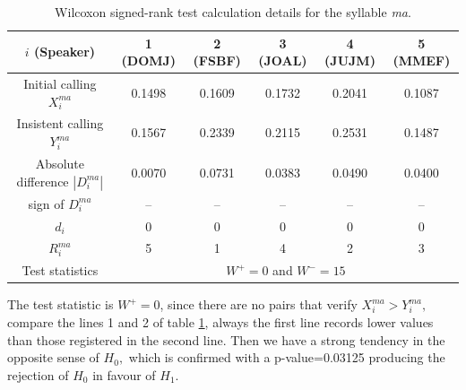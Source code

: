 \documentclass[11pt]{article}
\begin{document}
\begin{table}[!htb]
    \centering
    \footnotesize
        \caption{Wilcoxon signed-rank test calculation details for the syllable \textit{ma}.  }
    
    \begin{tabular}{c|ccccc}
        \hline
        $i$ (Speaker) & 
        1 {\tiny(DOMJ)} & %
        2 {\tiny(FSBF)} & %
        3 {\tiny(JOAL)} & %
        4 {\tiny(JUJM)} & %
        5 {\tiny(MMEF)} \\ %
        \hline
        Initial calling $X_i^{ma}$ &
        0.1498 &
        0.1609 &
        0.1732 &
        0.2041 &
        0.1087 \\
        Insistent calling $Y_i^{ma}$ &
        0.1567 &
        0.2339 &
        0.2115 &
        0.2531 &
        0.1487 \\
        Absolute difference $\left| D_i^{ma} \right|$ & %
        0.0070 &
        0.0731 &
        0.0383 &
        0.0490 &
        0.0400 \\
        sign of $ D_i^{ma}$ &
        -- &
        -- &
        -- &
        -- &
        --  \\
        $d_i$ &
        0 &
        0 &
        0 &
        0 &
        0  \\
        $R_i^{ma}$ & %
        5 &
        1 &
        4 &
        2 & 
        3 \\
        \hline
        Test statistics &
        \multicolumn{5}{c}{$W^{+} = 0$ and $W^{-}=15$} 
         \\
    \end{tabular}
\label{tab:case_ma}
\end{table}

The test statistic is  $W^+ = 0$, since there are no pairs that verify $X_i^{ma} > Y_i^{ma},$ compare the lines 1 and 2 of table \ref{tab:case_ma}, always the first line records lower values than those registered in the second line. Then we have a strong tendency in the opposite sense of $H_0,$ which is confirmed with a p-value=0.03125 producing the rejection of $H_0$ in favour of $H_1.$ 
\end{document}
